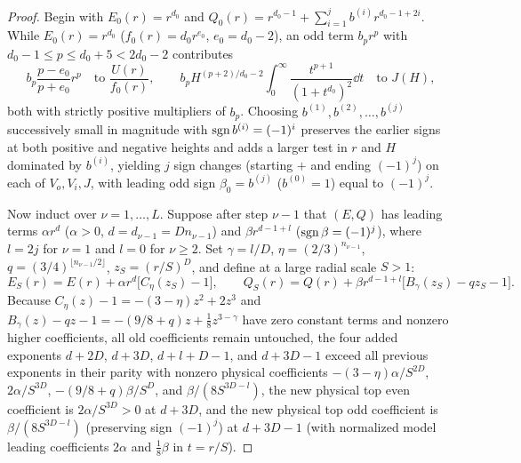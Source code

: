 \begin{proof}
Begin with $E_0(r)=r^{d_0}$ and $Q_0(r)=r^{d_0-1}+\sum_{i=1}^j b^{(i)} r^{d_0-1+2i}$. While
$E_0(r)=r^{d_0}$ ($f_0(r)=d_0 r^{e_0}$, $e_0=d_0-2$), an odd term $b_p r^p$ with $d_0-1\le p\le
d_0+5<2d_0-2$ contributes
\[
  b_p \frac{p-e_0}{p+e_0} r^p \quad \text{to } \frac{U(r)}{f_0(r)}, \qquad b_p H^{(p+2)/d_0 - 2}
  \int_0^\infty \frac{t^{p+1}}{(1+t^{d_0})^2}\dd t \quad \text{to } J(H),
\]
both with strictly positive multipliers of $b_p$. Choosing $b^{(1)},b^{(2)},\dots,b^{(j)}$
successively small in magnitude with $\operatorname{sgn} b^{(i)}=(-1)^i$ preserves the earlier signs at both
positive and negative heights and adds a larger test in $r$ and $H$ dominated by $b^{(i)}$, yielding $j$ sign changes
(starting $+$ and ending $(-1)^j$) on each of $V_o,V_i,J$, with leading odd sign $\beta_0=b^{(j)}$
($b^{(0)}=1$) equal to $(-1)^j$.

Now induct over $\nu=1,\dots,L$. Suppose after step $\nu-1$ that $(E,Q)$ has leading terms $\alpha
r^d$ ($\alpha>0$, $d=d_{\nu-1}=Dn_{\nu-1}$) and $\beta r^{d-1+l}$ ($\operatorname{sgn}\beta=(-1)^j$), where $l=2j$ for
$\nu=1$ and $l=0$ for $\nu\ge 2$. Set $\gamma=l/D$, $\eta=(2/3)^{n_{\nu-1}}$, $q=(3/4)^{\lfloor
n_{\nu-1}/2\rfloor}$, $z_S=(r/S)^D$, and define at a large radial scale $S>1$:
\[
  E_S(r) = E(r) + \alpha r^d\bigl[C_\eta(z_S) - 1\bigr], \qquad Q_S(r) = Q(r) + \beta r^{d-1+l}\bigl[B_\gamma(z_S) - qz_S - 1\bigr].
\]
Because $C_\eta(z)-1=-(3-\eta)z^2+2z^3$ and $B_\gamma(z)-qz-1=-(9/8+q)z+\frac{1}{8}z^{3-\gamma}$ have
zero constant terms and nonzero higher coefficients, all old coefficients remain untouched, the four
added exponents $d+2D$, $d+3D$, $d+l+D-1$, and $d+3D-1$ exceed all previous exponents in their parity
with nonzero physical coefficients $-(3-\eta)\alpha/S^{2D}$, $2\alpha/S^{3D}$, $-(9/8+q)\beta/S^D$,
and $\beta/(8S^{3D-l})$, the new physical top even coefficient is $2\alpha/S^{3D}>0$ at $d+3D$, and
the new physical top odd coefficient is $\beta/(8S^{3D-l})$ (preserving sign $(-1)^j$) at $d+3D-1$
(with normalized model leading coefficients $2\alpha$ and $\frac{1}{8}\beta$ in $t=r/S$).


\end{proof}
